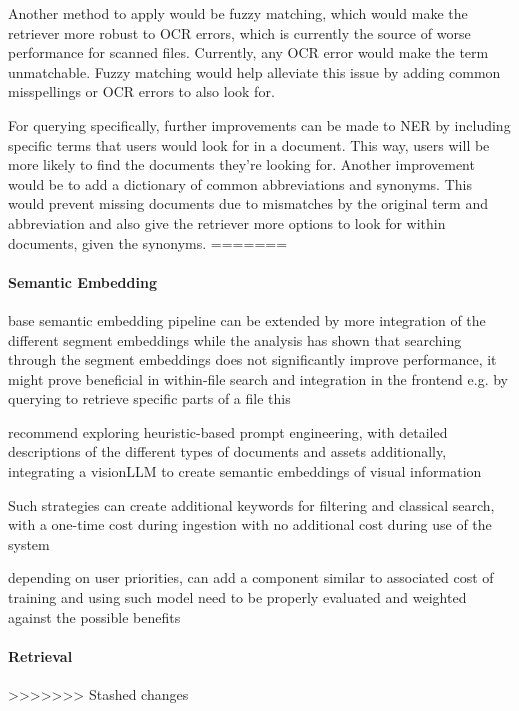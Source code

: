 Another method to apply would be fuzzy matching, which would make the retriever more robust to OCR errors, which is currently the source of worse performance for scanned files. Currently, any OCR error would make the term unmatchable. Fuzzy matching would help alleviate this issue by adding common misspellings or OCR errors to also look for.

For querying specifically, further improvements can be made to NER by including specific terms that users would look for in a document. This way, users will be more likely to find the documents they're looking for. Another improvement would be to add a dictionary of common abbreviations and synonyms. This would prevent missing documents due to mismatches by the original term and abbreviation and also give the retriever more options to look for within documents, given the synonyms.
=======
\paragraph{Semantic Embedding}

base semantic embedding pipeline can be extended by more integration of the different segment embeddings
while the analysis has shown that searching through the segment embeddings does not significantly improve performance, it might prove beneficial in within-file search and integration in the frontend
e.g. by querying to retrieve specific parts of a file
this 


recommend exploring heuristic-based prompt engineering, with detailed descriptions of the different types of documents and assets
additionally, integrating a visionLLM to create semantic embeddings of visual information 

Such strategies can create additional keywords for filtering and classical search, with a one-time cost during ingestion with no additional cost during use of the system

depending on user priorities, can add a component similar to \cite{gobels2024towards} 
associated cost of training and using such model need to be properly evaluated and weighted against the possible benefits





\paragraph{Retrieval}
>>>>>>> Stashed changes

